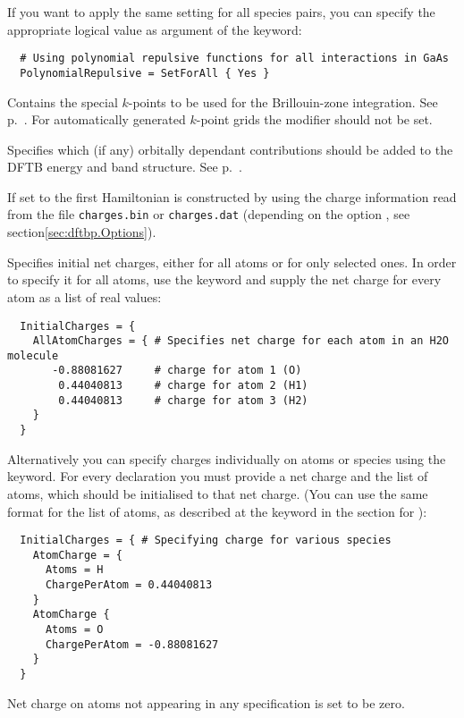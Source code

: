 \begin{description}
  If you want to apply the same setting for all species pairs, you can
  specify the appropriate logical value as argument of the
   keyword:

\begin{verbatim}
  # Using polynomial repulsive functions for all interactions in GaAs
  PolynomialRepulsive = SetForAll { Yes }
\end{verbatim}

\item[\is{KPointsAndWeights}] Contains the
  special $k$-points to be used for the Bril\-louin-zone integration.
  See p.~. For automatically generated
  $k$-point grids the modifier should not be set.

\item[\is{OrbitalPotential}] Specifies which (if any) orbitally
  dependant contributions should be added to the DFTB energy and
  band structure. See p.~.


\item[\is{ReadInitialCharges}] If set to  the first Hamiltonian is
  constructed by using the charge information read from the file
  \verb|charges.bin| or \verb|charges.dat| (depending on the option
  , see section\ref{sec:dftbp.Options}).

\item[\is{InitialCharges}] Specifies initial net charges, either for
  all atoms or for only selected ones. In order to specify it for all
  atoms, use the keyword  and supply the net charge
  for every atom as a list of real values:
\begin{verbatim}
  InitialCharges = {
    AllAtomCharges = { # Specifies net charge for each atom in an H2O molecule
       -0.88081627     # charge for atom 1 (O)
        0.44040813     # charge for atom 2 (H1)
        0.44040813     # charge for atom 3 (H2)
    }
  }
\end{verbatim}
  Alternatively you can specify charges individually on atoms or
  species using the  keyword. For every 
  declaration you must provide a net charge and the list of atoms,
  which should be initialised to that net charge. (You can use the
  same format for the list of atoms, as described at the
   keyword in the section for ):
\begin{verbatim}
  InitialCharges = { # Specifying charge for various species
    AtomCharge = {
      Atoms = H
      ChargePerAtom = 0.44040813
    }
    AtomCharge {
      Atoms = O
      ChargePerAtom = -0.88081627
    }
  }
\end{verbatim}
  Net charge on atoms not appearing in any 
  specification is set to be zero.



\end{description}

